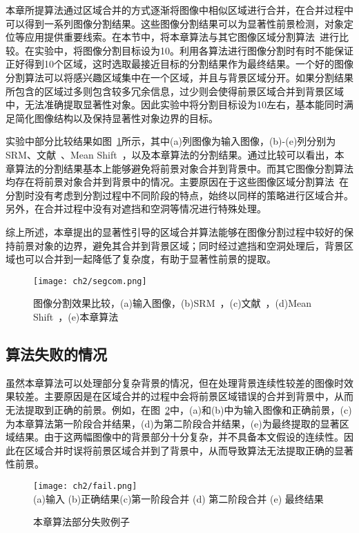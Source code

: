 本章所提算法通过区域合并的方式逐渐将图像中相似区域进行合并，在合并过程中可以得到一系列图像分割结果。这些图像分割结果可以为显著性前景检测，对象定位等应用提供重要线索。在本节中，将本章算法与其它图像区域分割算法~\cite{Richard2004Statistical,Xiao2015Complexity,MeanShift}进行比较。在实验中，将图像分割目标设为10。利用各算法进行图像分割时有时不能保证正好得到10个区域，这时选取最接近目标的分割结果作为最终结果。一个好的图像分割算法可以将感兴趣区域集中在一个区域，并且与背景区域分开。如果分割结果所包含的区域过多则包含较多冗余信息，过少则会使得前景区域合并到背景区域中，无法准确提取显著性对象。因此实验中将分割目标设为10左右，基本能同时满足简化图像结构以及保持显著性对象边界的目标。\par
实验中部分比较结果如图~\ref{fig:segCom}所示，其中(a)列图像为输入图像，(b)-(e)列分别为SRM、文献~、Mean Shift~\cite{MeanShift}，以及本章算法的分割结果。通过比较可以看出，本章算法的分割结果基本上能够避免将前景对象合并到背景中。而其它图像分割算法均存在将前景对象合并到背景中的情况。主要原因在于这些图像区域分割算法~\cite{Richard2004Statistical,Xiao2015Complexity,MeanShift}在分割时没有考虑到分割过程中不同阶段的特点，始终以同样的策略进行区域合并。另外，在合并过程中没有对遮挡和空洞等情况进行特殊处理。\par
综上所述，本章提出的显著性引导的区域合并算法能够在图像分割过程中较好的保持前景对象的边界，避免其合并到背景区域；同时经过遮挡和空洞处理后，背景区域也可以合并到一起降低了复杂度，有助于显著性前景的提取。
\begin{figure}[htb]
  \centering%
      {\texttt{[image: ch2/segcom.png]}}\\

  \caption{图像分割效果比较，(a)输入图像，(b)SRM~\cite{Richard2004Statistical}，(c)文献~，(d)Mean Shift~\cite{MeanShift}，(e)本章算法}
  \label{fig:segCom}
\end{figure}


\subsection{算法失败的情况}
\label{subsec:failure}

虽然本章算法可以处理部分复杂背景的情况，但在处理背景连续性较差的图像时效果较差。主要原因是在区域合并的过程中会将前景区域错误的合并到背景中，从而无法提取到正确的前景。例如，在图~\ref{fig:fail}中，(a)和(b)中为输入图像和正确前景，(c)为本章算法第一阶段合并结果，(d)为第二阶段合并结果，(e)为最终提取的显著区域结果。由于这两幅图像中的背景部分十分复杂，并不具备本文假设的连续性。因此在区域合并时误将前景区域合并到了背景中，从而导致算法无法提取正确的显著性前景。
 \begin{figure}[htb]
  \centering%
      {\texttt{[image: ch2/fail.png]}}\\
(a)输入 \quad\quad \quad(b)正确结果(c)第一阶段合并 (d) 第二阶段合并 (e) 最终结果\\
  \caption{本章算法部分失败例子}
  \label{fig:fail}
\end{figure}


